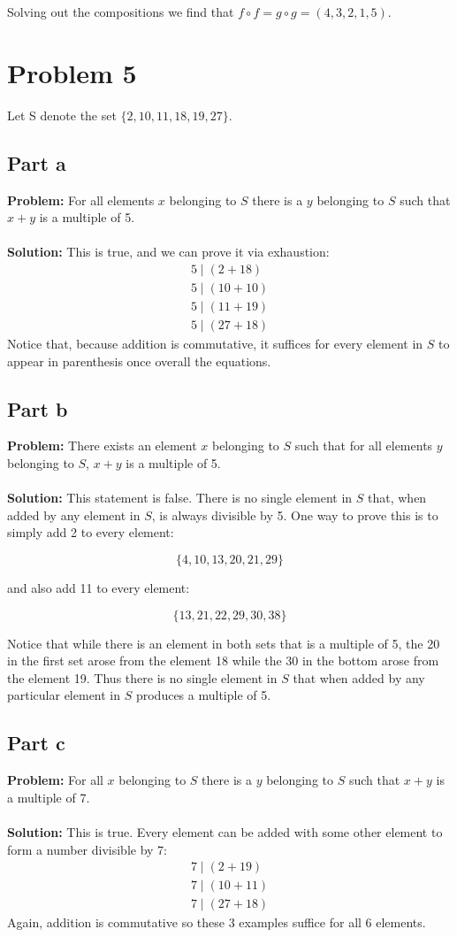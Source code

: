 \documentclass{article}
\begin{document}
Solving out the compositions we find that $f\circ f=g\circ g=(4,3,2,1,5)$.

\section{Problem 5}
Let S denote the set $\{2, 10, 11, 18, 19, 27\}$.
\subsection{Part a}
\textbf{Problem:} For all elements $x$ belonging to $S$ there is a $y$ belonging to $S$ such that $x + y$ is a multiple of 5.
\\\\
\textbf{Solution:} This is true, and we can prove it via exhaustion:
\begin{gather*}
5\mid (2+18)\\
5\mid (10+10)\\
5\mid (11+19)\\
5\mid (27+18)
\end{gather*}
Notice that, because addition is commutative, it suffices for every element in $S$ to appear in parenthesis once overall the equations.

\subsection{Part b}
\textbf{Problem:} There exists an element $x$ belonging to $S$ such that for all elements $y$ belonging to $S$, $x + y$ is a multiple of 5.
\\\\
\textbf{Solution:} This statement is false. There is no single element in $S$ that, when added by any element in $S$, is always divisible by 5. One way to prove this is to simply add 2 to every element:

$$\{4,10,13,20,21,29\}$$

and also add 11 to every element:

$$\{13,21,22,29,30,38\}$$

Notice that while there is an element in both sets that is a multiple of 5, the 20 in the first set arose from the element 18 while the 30 in the bottom arose from the element 19. Thus there is no single element in $S$ that when added by any particular element in $S$ produces a multiple of 5.

\subsection{Part c}
\textbf{Problem:} For all $x$ belonging to $S$ there is a $y$ belonging to $S$ such that $x + y$ is a multiple of 7.
\\\\
\textbf{Solution:} This is true. Every element can be added with some other element to form a number divisible by 7:
\begin{gather*}
7\mid (2+19)\\
7\mid (10+11)\\
7\mid (27+18)
\end{gather*}
Again, addition is commutative so these 3 examples suffice for all 6 elements.
\end{document}
